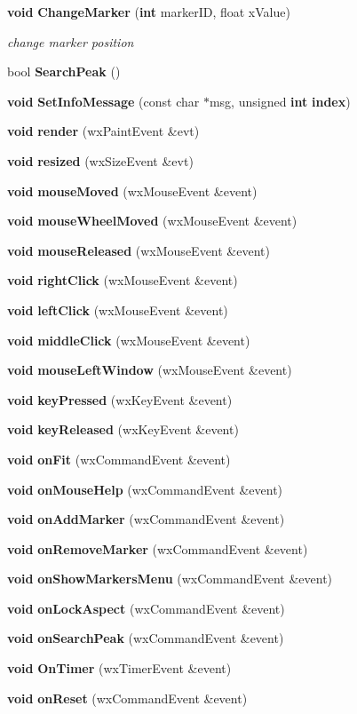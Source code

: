 \begin{DoxyCompactItemize}
{\bf void} {\bf Change\+Marker} ({\bf int} marker\+ID, float x\+Value)
\begin{DoxyCompactList}\small\item\em change marker position \end{DoxyCompactList}\item 
bool {\bf Search\+Peak} ()
\item 
{\bf void} {\bf Set\+Info\+Message} (const char $\ast$msg, unsigned {\bf int} {\bf index})
\item 
{\bf void} {\bf render} (wx\+Paint\+Event \&evt)
\item 
{\bf void} {\bf resized} (wx\+Size\+Event \&evt)
\item 
{\bf void} {\bf mouse\+Moved} (wx\+Mouse\+Event \&event)
\item 
{\bf void} {\bf mouse\+Wheel\+Moved} (wx\+Mouse\+Event \&event)
\item 
{\bf void} {\bf mouse\+Released} (wx\+Mouse\+Event \&event)
\item 
{\bf void} {\bf right\+Click} (wx\+Mouse\+Event \&event)
\item 
{\bf void} {\bf left\+Click} (wx\+Mouse\+Event \&event)
\item 
{\bf void} {\bf middle\+Click} (wx\+Mouse\+Event \&event)
\item 
{\bf void} {\bf mouse\+Left\+Window} (wx\+Mouse\+Event \&event)
\item 
{\bf void} {\bf key\+Pressed} (wx\+Key\+Event \&event)
\item 
{\bf void} {\bf key\+Released} (wx\+Key\+Event \&event)
\item 
{\bf void} {\bf on\+Fit} (wx\+Command\+Event \&event)
\item 
{\bf void} {\bf on\+Mouse\+Help} (wx\+Command\+Event \&event)
\item 
{\bf void} {\bf on\+Add\+Marker} (wx\+Command\+Event \&event)
\item 
{\bf void} {\bf on\+Remove\+Marker} (wx\+Command\+Event \&event)
\item 
{\bf void} {\bf on\+Show\+Markers\+Menu} (wx\+Command\+Event \&event)
\item 
{\bf void} {\bf on\+Lock\+Aspect} (wx\+Command\+Event \&event)
\item 
{\bf void} {\bf on\+Search\+Peak} (wx\+Command\+Event \&event)
\item 
{\bf void} {\bf On\+Timer} (wx\+Timer\+Event \&event)
\item 
{\bf void} {\bf on\+Reset} (wx\+Command\+Event \&event)
\end{DoxyCompactItemize}
